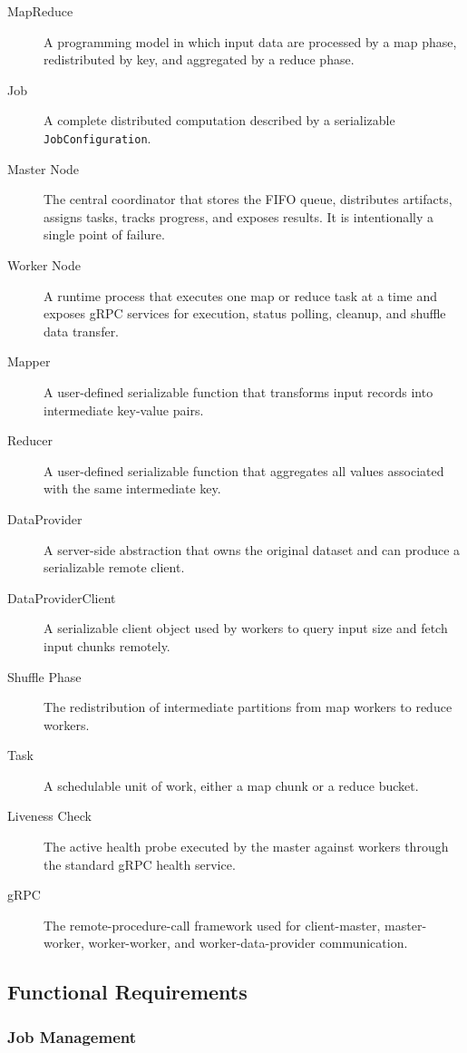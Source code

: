 \documentclass{scrartcl}
\begin{document}
\begin{description}
    \item[MapReduce] A programming model in which input data are processed by a map phase, redistributed by key, and aggregated by a reduce phase.
    \item[Job] A complete distributed computation described by a serializable \texttt{JobConfiguration}.
    \item[Master Node] The central coordinator that stores the FIFO queue, distributes artifacts, assigns tasks, tracks progress, and exposes results. It is intentionally a single point of failure.
    \item[Worker Node] A runtime process that executes one map or reduce task at a time and exposes gRPC services for execution, status polling, cleanup, and shuffle data transfer.
    \item[Mapper] A user-defined serializable function that transforms input records into intermediate key-value pairs.
    \item[Reducer] A user-defined serializable function that aggregates all values associated with the same intermediate key.
    \item[DataProvider] A server-side abstraction that owns the original dataset and can produce a serializable remote client.
    \item[DataProviderClient] A serializable client object used by workers to query input size and fetch input chunks remotely.
    \item[Shuffle Phase] The redistribution of intermediate partitions from map workers to reduce workers.
    \item[Task] A schedulable unit of work, either a map chunk or a reduce bucket.
    \item[Liveness Check] The active health probe executed by the master against workers through the standard gRPC health service.
    \item[gRPC] The remote-procedure-call framework used for client-master, master-worker, worker-worker, and worker-data-provider communication.
\end{description}

\subsection{Functional Requirements}

\subsubsection{Job Management}
\end{document}
